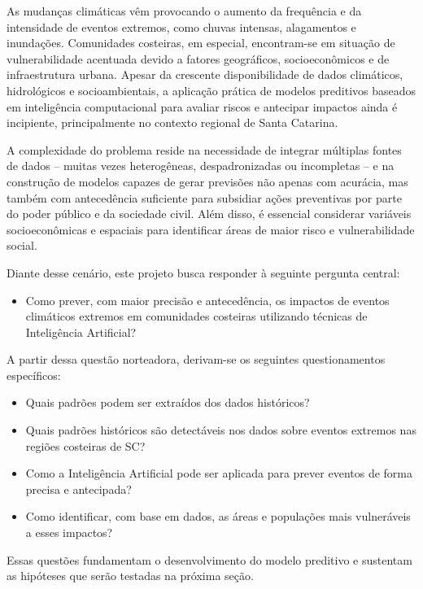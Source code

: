 As mudanças climáticas vêm provocando o aumento da frequência e da intensidade de eventos extremos, como chuvas intensas, alagamentos e inundações. Comunidades costeiras, em especial, encontram-se em situação de vulnerabilidade acentuada devido a fatores geográficos, socioeconômicos e de infraestrutura urbana. Apesar da crescente disponibilidade de dados climáticos, hidrológicos e socioambientais, a aplicação prática de modelos preditivos baseados em inteligência computacional para avaliar riscos e antecipar impactos ainda é incipiente, principalmente no contexto regional de Santa Catarina.

A complexidade do problema reside na necessidade de integrar múltiplas fontes de dados -- muitas vezes heterogêneas, despadronizadas ou incompletas -- e na construção de modelos capazes de gerar previsões não apenas com acurácia, mas também com antecedência suficiente para subsidiar ações preventivas por parte do poder público e da sociedade civil. Além disso, é essencial considerar variáveis socioeconômicas e espaciais para identificar áreas de maior risco e vulnerabilidade social.

Diante desse cenário, este projeto busca responder à seguinte pergunta central:

\begin{itemize}
  \item Como prever, com maior precisão e antecedência, os impactos de eventos climáticos extremos em comunidades costeiras utilizando técnicas de Inteligência Artificial?
\end{itemize}

A partir dessa questão norteadora, derivam-se os seguintes questionamentos específicos:

\begin{itemize}
  \item Quais padrões podem ser extraídos dos dados históricos?
  \item Quais padrões históricos são detectáveis nos dados sobre eventos extremos nas regiões costeiras de SC?
  \item Como a Inteligência Artificial pode ser aplicada para prever eventos de forma precisa e antecipada?
  \item Como identificar, com base em dados, as áreas e populações mais vulneráveis a esses impactos?
\end{itemize}

Essas questões fundamentam o desenvolvimento do modelo preditivo e sustentam as hipóteses que serão testadas na próxima seção.

